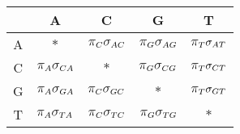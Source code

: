 \begingroup\centering
\begin{tabular}{c||c|c|c|c}
& A & C & G & T\\
\hline\hline
A & $\ast$ & $\grande{\pi}_C \grande{\sigma}_{AC}$ & $\grande{\pi}_G \grande{\sigma}_{AG}$ & $\grande{\pi}_T \sigma_{AT}$\\
C & $\grande{\pi}_A \grande{\sigma}_{CA}$ & $\ast$ & $\grande{\pi}_G \grande{\sigma}_{CG}$ & $\grande{\pi}_T \sigma_{CT}$\\
G & $\grande{\pi}_A \grande{\sigma}_{GA}$ & $\grande{\pi}_C \grande{\sigma}_{GC}$ & $\ast$ & $\grande{\pi}_T \sigma_{GT}$\\
T & $\grande{\pi}_A \grande{\sigma}_{TA}$ & $\grande{\pi}_C \grande{\sigma}_{TC}$ & $\grande{\pi}_G \grande{\sigma}_{TG}$ & $\ast$\\
\end{tabular}
\par\endgroup
